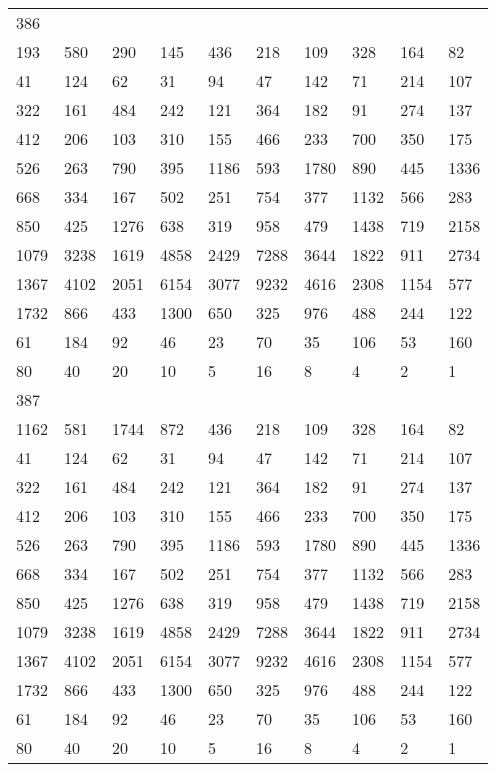 \begin{longtable}{*{10}{l}}
386&&&&&&&&&\\
193& 580& 290& 145& 436& 218& 109& 328& 164& 82\\
41& 124& 62& 31& 94& 47& 142& 71& 214& 107\\
322& 161& 484& 242& 121& 364& 182& 91& 274& 137\\
412& 206& 103& 310& 155& 466& 233& 700& 350& 175\\
526& 263& 790& 395& 1186& 593& 1780& 890& 445& 1336\\
668& 334& 167& 502& 251& 754& 377& 1132& 566& 283\\
850& 425& 1276& 638& 319& 958& 479& 1438& 719& 2158\\
1079& 3238& 1619& 4858& 2429& 7288& 3644& 1822& 911& 2734\\
1367& 4102& 2051& 6154& 3077& 9232& 4616& 2308& 1154& 577\\
1732& 866& 433& 1300& 650& 325& 976& 488& 244& 122\\
61& 184& 92& 46& 23& 70& 35& 106& 53& 160\\
80& 40& 20& 10& 5& 16& 8& 4& 2& 1\\

387&&&&&&&&&\\
1162& 581& 1744& 872& 436& 218& 109& 328& 164& 82\\
41& 124& 62& 31& 94& 47& 142& 71& 214& 107\\
322& 161& 484& 242& 121& 364& 182& 91& 274& 137\\
412& 206& 103& 310& 155& 466& 233& 700& 350& 175\\
526& 263& 790& 395& 1186& 593& 1780& 890& 445& 1336\\
668& 334& 167& 502& 251& 754& 377& 1132& 566& 283\\
850& 425& 1276& 638& 319& 958& 479& 1438& 719& 2158\\
1079& 3238& 1619& 4858& 2429& 7288& 3644& 1822& 911& 2734\\
1367& 4102& 2051& 6154& 3077& 9232& 4616& 2308& 1154& 577\\
1732& 866& 433& 1300& 650& 325& 976& 488& 244& 122\\
61& 184& 92& 46& 23& 70& 35& 106& 53& 160\\
80& 40& 20& 10& 5& 16& 8& 4& 2& 1\\


\end{longtable}
